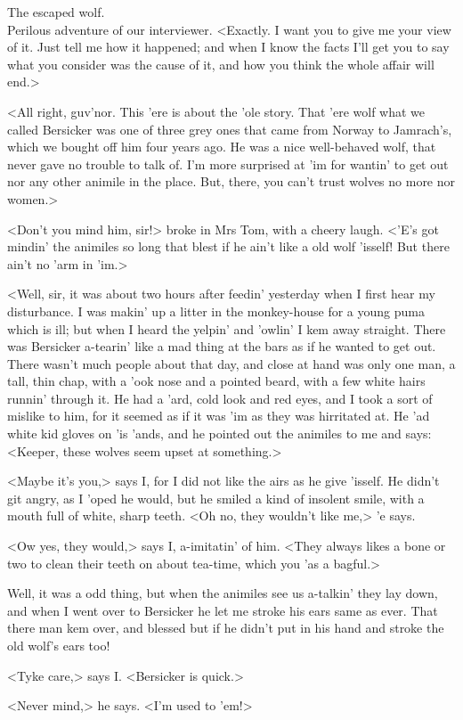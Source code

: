 \begin{newspaper}{The escaped wolf.\\Perilous adventure of our interviewer.}
<Exactly. I want you to give me your view of it. Just tell me how it happened; and when I know the facts I'll get you to say what you consider was the cause of it, and how you think the whole affair will end.>

<All right, guv'nor. This 'ere is about the 'ole story. That 'ere wolf what we called Bersicker was one of three grey ones that came from Norway to Jamrach's, which we bought off him four years ago. He was a nice well-behaved wolf, that never gave no trouble to talk of. I'm more surprised at 'im for wantin' to get out nor any other animile in the place. But, there, you can't trust wolves no more nor women.>

<Don't you mind him, sir!> broke in Mrs Tom, with a cheery laugh. <'E's got mindin' the animiles so long that blest if he ain't like a old wolf 'isself! But there ain't no 'arm in 'im.>

<Well, sir, it was about two hours after feedin' yesterday when I first hear my disturbance. I was makin' up a litter in the monkey-house for a young puma which is ill; but when I heard the yelpin' and 'owlin' I kem away straight. There was Bersicker a-tearin' like a mad thing at the bars as if he wanted to get out. There wasn't much people about that day, and close at hand was only one man, a tall, thin chap, with a 'ook nose and a pointed beard, with a few white hairs runnin' through it. He had a 'ard, cold look and red eyes, and I took a sort of mislike to him, for it seemed as if it was 'im as they was hirritated at. He 'ad white kid gloves on 'is 'ands, and he pointed out the animiles to me and says: <Keeper, these wolves seem upset at something.>

<Maybe it's you,> says I, for I did not like the airs as he give 'isself. He didn't git angry, as I 'oped he would, but he smiled a kind of insolent smile, with a mouth full of white, sharp teeth. <Oh no, they wouldn't like me,> 'e says.

<Ow yes, they would,> says I, a-imitatin' of him. <They always likes a bone or two to clean their teeth on about tea-time, which you 'as a bagful.>

Well, it was a odd thing, but when the animiles see us a-talkin' they lay down, and when I went over to Bersicker he let me stroke his ears same as ever. That there man kem over, and blessed but if he didn't put in his hand and stroke the old wolf's ears too!

<Tyke care,> says I\@. <Bersicker is quick.>

<Never mind,> he says. <I'm used to 'em!>


\end{newspaper}
